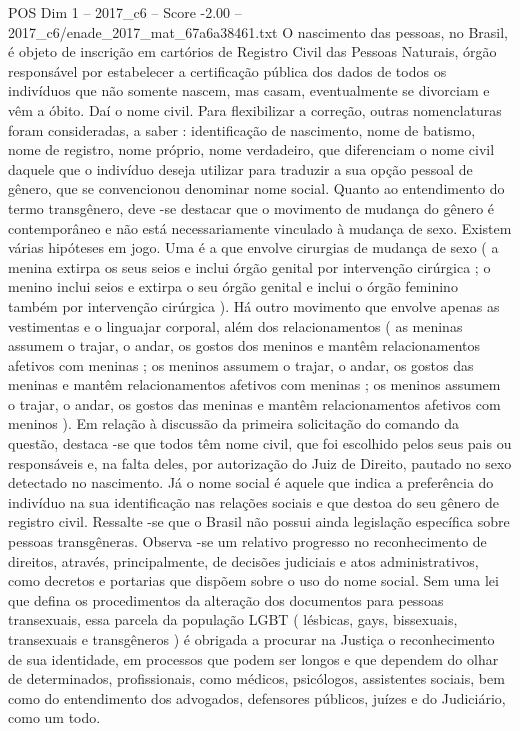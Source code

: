 \begin{textsample}{POS Dim 1 – 2017\_c6 – Score -2.00 – 2017\_c6/enade\_2017\_mat\_67a6a38461.txt}
O nascimento das pessoas, no Brasil, é objeto de inscrição em cartórios de Registro Civil das Pessoas Naturais, órgão responsável por estabelecer a certificação pública dos dados de todos os indivíduos que não somente nascem, mas casam, eventualmente se divorciam e vêm a óbito.
Daí o nome civil.
Para flexibilizar a correção, outras nomenclaturas foram consideradas, a saber : identificação de nascimento, nome de batismo, nome de registro, nome próprio, nome verdadeiro, que diferenciam o nome civil daquele que o indivíduo deseja utilizar para traduzir a sua opção pessoal de gênero, que se convencionou denominar nome social.
Quanto ao entendimento do termo transgênero, deve -se destacar que o movimento de mudança do gênero é contemporâneo e não está necessariamente vinculado à mudança de sexo.
Existem várias hipóteses em jogo.
Uma é a que envolve cirurgias de mudança de sexo ( a menina extirpa os seus seios e inclui órgão genital por intervenção cirúrgica ; o menino inclui seios e extirpa o seu órgão genital e inclui o órgão feminino também por intervenção cirúrgica ).
Há outro movimento que envolve apenas as vestimentas e o linguajar corporal, além dos relacionamentos ( as meninas assumem o trajar, o andar, os gostos dos meninos e mantêm relacionamentos afetivos com meninas ; os meninos assumem o trajar, o andar, os gostos das meninas e mantêm relacionamentos afetivos com meninas ; os meninos assumem o trajar, o andar, os gostos das meninas e mantêm relacionamentos afetivos com meninos ).
Em relação à discussão da primeira solicitação do comando da questão, destaca -se que todos têm nome civil, que foi escolhido pelos seus pais ou responsáveis e, na falta deles, por autorização do Juiz de Direito, pautado no sexo detectado no nascimento.
Já o nome social é aquele que indica a preferência do indivíduo na sua identificação nas relações sociais e que destoa do seu gênero de registro civil.
Ressalte -se que o Brasil não possui ainda legislação específica sobre pessoas transgêneras.
Observa -se um relativo progresso no reconhecimento de direitos, através, principalmente, de decisões judiciais e atos administrativos, como decretos e portarias que dispõem sobre o uso do nome social.
Sem uma lei que defina os procedimentos da alteração dos documentos para pessoas transexuais, essa parcela da população LGBT ( lésbicas, gays, bissexuais, transexuais e transgêneros ) é obrigada a procurar na Justiça o reconhecimento de sua identidade, em processos que podem ser longos e que dependem do olhar de determinados, profissionais, como médicos, psicólogos, assistentes sociais, bem como do entendimento dos advogados, defensores públicos, juízes e do Judiciário, como um todo.

\end{textsample}
